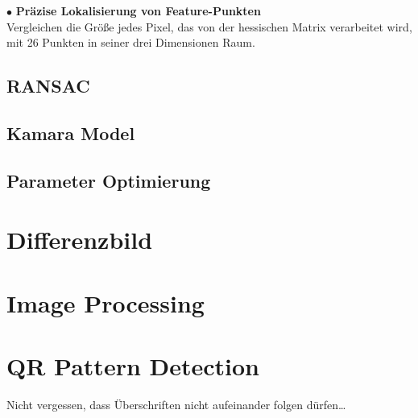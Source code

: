 $\bullet$ \textbf{Präzise Lokalisierung von Feature-Punkten}\\
Vergleichen die Größe jedes Pixel, das von der hessischen Matrix verarbeitet wird, mit 26 Punkten in seiner drei Dimensionen Raum.

\subsection{RANSAC}

\subsection{Kamara Model}

\subsection{Parameter Optimierung}

\section{Differenzbild}


\section{Image Processing} 


\section{QR Pattern Detection} 


Nicht vergessen, dass Überschriften nicht aufeinander folgen dürfen\ldots

